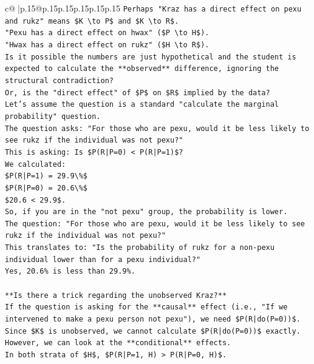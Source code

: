 \documentclass{article}
\begin{document}
{\begin{supertabular}{c@{$\;$}|p{.15\linewidth}@{}p{.15\linewidth}p{.15\linewidth}p{.15\linewidth}p{.15\linewidth}p{.15\linewidth}}
{{{\texttt{Perhaps "Kraz has a direct effect on pexu and rukz" means \$K \textbackslash{}to P\$ and \$K \textbackslash{}to R\$.} \\
\texttt{"Pexu has a direct effect on hwax" (\$P \textbackslash{}to H\$).} \\
\texttt{"Hwax has a direct effect on rukz" (\$H \textbackslash{}to R\$).} \\
\texttt{Is it possible the numbers are just hypothetical and the student is expected to calculate the **observed** difference, ignoring the structural contradiction?} \\
\texttt{Or, is the "direct effect" of \$P\$ on \$R\$ implied by the data?} \\
\texttt{Let's assume the question is a standard "calculate the marginal probability" question.} \\
\texttt{The question asks: "For those who are pexu, would it be less likely to see rukz if the individual was not pexu?"} \\
\texttt{This is asking: Is \$P(R|P=0) < P(R|P=1)\$?} \\
\texttt{We calculated:} \\
\texttt{\$P(R|P=1) = 29.9\textbackslash{}\%\$} \\
\texttt{\$P(R|P=0) = 20.6\textbackslash{}\%\$} \\
\texttt{\$20.6 < 29.9\$.} \\
\texttt{So, if you are in the "not pexu" group, the probability is lower.} \\
\texttt{The question: "For those who are pexu, would it be less likely to see rukz if the individual was not pexu?"} \\
\texttt{This translates to: "Is the probability of rukz for a non{-}pexu individual lower than for a pexu individual?"} \\
\texttt{Yes, 20.6\% is less than 29.9\%.} \\
\\ 
\texttt{**Is there a trick regarding the unobserved Kraz?**} \\
\texttt{If the question is asking for the **causal** effect (i.e., "If we intervened to make a pexu person not pexu"), we need \$P(R|do(P=0))\$.} \\
\texttt{Since \$K\$ is unobserved, we cannot calculate \$P(R|do(P=0))\$ exactly.} \\
\texttt{However, we can look at the **conditional** effects.} \\
\texttt{In both strata of \$H\$, \$P(R|P=1, H) > P(R|P=0, H)\$.} \\
}}}
\end{supertabular}}
\end{document}
